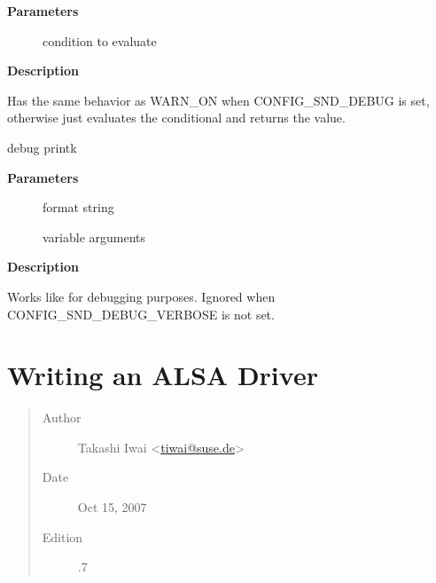 \documentclass[a4paper,8pt,english]{sphinxmanual}
\begin{document}
\textbf{Parameters}
\begin{description}
\item[{}] \leavevmode
condition to evaluate

\end{description}

\textbf{Description}

Has the same behavior as WARN\_ON when CONFIG\_SND\_DEBUG is set,
otherwise just evaluates the conditional and returns the value.

\begin{fulllineitems}
\label{sound/kernel-api/alsa-driver-api:c.snd_printdd}
debug printk

\end{fulllineitems}


\textbf{Parameters}
\begin{description}
\item[{}] \leavevmode
format string

\item[{}] \leavevmode
variable arguments

\end{description}

\textbf{Description}

Works like  for debugging purposes.
Ignored when CONFIG\_SND\_DEBUG\_VERBOSE is not set.


\section{Writing an ALSA Driver}
\label{sound/kernel-api/writing-an-alsa-driver:writing-an-alsa-driver}\label{sound/kernel-api/writing-an-alsa-driver::doc}\begin{quote}\begin{description}
\item[{Author}] \leavevmode
Takashi Iwai \textless{}\href{mailto:tiwai@suse.de}{tiwai@suse.de}\textgreater{}

\item[{Date}] \leavevmode
Oct 15, 2007

\item[{Edition}] .7

\end{description}\end{quote}
\end{document}

